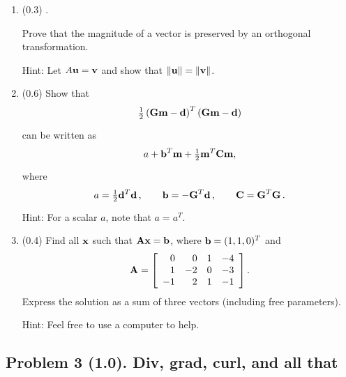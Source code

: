 \documentclass[11pt,titlepage,fleqn]{article}
\begin{document}
\begin{enumerate}
\begin{enumerate}
\end{enumerate}


\item (0.3) \citep[][p.~473, P10]{SteinWysession}.

Prove that the magnitude of a vector is preserved by an orthogonal transformation.

Hint: Let $A\mbox{${\bf u}$} = \mbox{${\bf v}$}$ and show that $\|\mbox{${\bf u}$}\| = \|\mbox{${\bf v}$}\|$.


\item (0.6) Show that 
%
\begin{eqnarray}
\hlf \left(\bG\bem - \bd \right)^T \left(\bG\bem - \bd\right)
\end{eqnarray}
%
can be written as 
%
\begin{eqnarray}
a + \bb^T\bem + \hlf \bem^T\bC\bem,
\end{eqnarray}
%
where
%
\begin{equation}
a = \hlf\bd^T\bd
\,,\hspace{20pt}
\bb = -\bG^T\bd
\,,\hspace{20pt}
\bC = \bG^T\bG
\,.
\end{equation}
%
Hint: For a scalar $a$, note that $a = a^T$.


\item (0.4) Find all $\mbox{${\bf x}$}$ such that $\mbox{${\bf A}$}\mbox{${\bf x}$} = \mbox{${\bf b}$}$, where $\mbox{${\bf b}$} = (1, 1, 0)^T$ and
%
\begin{eqnarray*}
\mbox{${\bf A}$} =  \left[ \begin{array}{rrrr}
     0  &   0  &   1 & -4 \\
     1  &   -2  &   0 & -3 \\
     -1  &   2  &   1 & -1 \\
\end{array} \right].
\end{eqnarray*}
%
Express the solution as a sum of three vectors (including free parameters).

Hint: Feel free to use a computer to help.

\end{enumerate}


\pagebreak
\subsection*{Problem 3 (1.0). Div, grad, curl, and all that}
\end{document}
